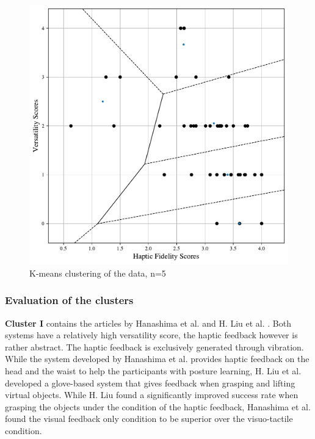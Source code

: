 \begin{figure}[htbp]
    \centering
    \includegraphics[width=\columnwidth]{figures/k_means_5.pdf} 
    \caption{K-means clustering of the data, n=5}
    \label{fig:kmeans}
\end{figure}



\subsubsection{Evaluation of the clusters}

\textbf{Cluster I} contains the articles by Hanashima et al. and H. Liu et al. \cite{Hanashima2023, LiuH2019}. Both systems have a relatively high versatility score, the haptic feedback however is rather abstract. The haptic feedback is exclusively generated through vibration. While the system developed by Hanashima et al. provides haptic feedback on the head and the waist to help the participants with posture learning, H. Liu et al. developed a glove-based system that gives feedback when grasping and lifting virtual objects. While H. Liu found a significantly improved success rate when grasping the objects under the condition of the haptic feedback, Hanashima et al. found the visual feedback only condition to be superior over the visuo-tactile condition. 


